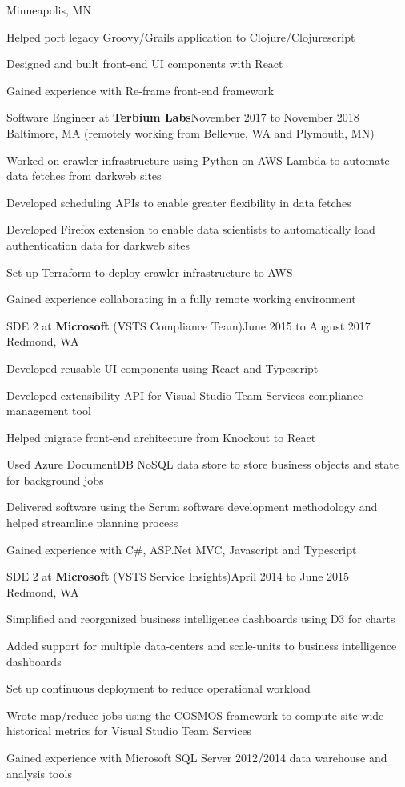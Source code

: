 \documentclass[letterpaper]{article}
\newenvironment{resume-list}
{\begin{itemize}
 \setlength{\itemsep}{0pt}
 \setlength{\parskip}{0pt}}
{\end{itemize}}
\begin{document}
Minneapolis, MN
\begin{resume-list}
\item Helped port legacy Groovy/Grails application to Clojure/Clojurescript
\item Designed and built front-end UI components with React
\item Gained experience with Re-frame front-end framework
\end{resume-list}
\noindent Software Engineer at {\bfseries Terbium Labs}\dotfill November 2017 to November 2018\\
Baltimore, MA (remotely working from Bellevue, WA and Plymouth, MN)
\begin{resume-list}
\item Worked on crawler infrastructure using Python on AWS Lambda to automate data fetches from darkweb sites
\item Developed scheduling APIs to enable greater flexibility in data fetches
\item Developed Firefox extension to enable data scientists to automatically load authentication data for darkweb sites
\item Set up Terraform to deploy crawler infrastructure to AWS
\item Gained experience collaborating in a fully remote working environment
\end{resume-list}
\noindent SDE 2 at {\bfseries Microsoft} (VSTS Compliance Team)\dotfill June 2015 to August 2017\\
Redmond, WA
\begin{resume-list}
\item Developed reusable UI components using React and Typescript
\item Developed extensibility API for Visual Studio Team Services compliance management tool
\item Helped migrate front-end architecture from Knockout to React
\item Used Azure DocumentDB NoSQL data store to store business objects and state for background jobs
\item Delivered software using the Scrum software development methodology and helped streamline planning process
\item Gained experience with C\#, ASP.Net MVC, Javascript and Typescript
\end{resume-list}
\noindent SDE 2 at {\bfseries Microsoft} (VSTS Service Insights)\dotfill April 2014 to June 2015\\
Redmond, WA
\begin{resume-list}
\item Simplified and reorganized business intelligence dashboards using D3 for charts
\item Added support for multiple data-centers and scale-units to business intelligence dashboards
\item Set up continuous deployment to reduce operational workload
\item Wrote map/reduce jobs using the COSMOS framework to compute site-wide historical metrics for Visual Studio Team Services
\item Gained experience with Microsoft SQL Server 2012/2014 data warehouse and analysis tools
\end{resume-list}
\end{document}
